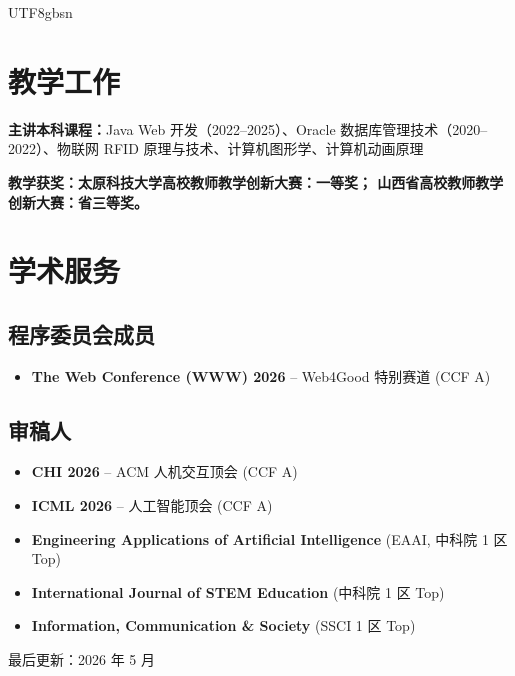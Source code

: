 \documentclass[a4paper,10pt]{article}
\begin{document}
\begin{CJK*}{UTF8}{gbsn}
\section*{教学工作}

\noindent
\textbf{主讲本科课程：}Java Web 开发（2022--2025）、Oracle 数据库管理技术（2020--2022）、物联网 RFID 原理与技术、计算机图形学、计算机动画原理

\noindent
\textbf{教学获奖：太原科技大学高校教师教学创新大赛：一等奖；
山西省高校教师教学创新大赛：省三等奖。}

\section*{学术服务}

\subsection*{程序委员会成员}
\begin{itemize}[leftmargin=*]
    \item \textbf{The Web Conference (WWW) 2026} -- Web4Good 特别赛道 (CCF A)
\end{itemize}

\subsection*{审稿人}
\begin{itemize}[leftmargin=*]
    \item \textbf{CHI 2026} -- ACM 人机交互顶会 (CCF A)
    \item \textbf{ICML 2026} -- 人工智能顶会 (CCF A)
    \item \textbf{Engineering Applications of Artificial Intelligence} (EAAI, 中科院 1 区 Top)
    \item \textbf{International Journal of STEM Education} (中科院 1 区 Top)
    \item \textbf{Information, Communication \& Society} (SSCI 1 区 Top)
\end{itemize}


\vfill
\begin{center}
    \small 最后更新：2026 年 5 月
\end{center}

\ifPDFTeX
\end{CJK*}
\fi
\end{document}
